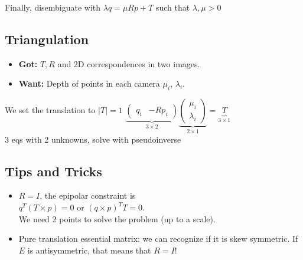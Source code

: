 Finally, disembiguate with $\lambda q = \mu R p + T$ such that $\lambda,
\mu > 0$

\subsection*{Triangulation}
\begin{itemize}
  \item \textbf{Got:} $T, R$ and 2D correspondences in two images.
  \item \textbf{Want:} Depth of points in each camera $\mu_i$, $\lambda_i$.
\end{itemize}

We set the translation to $|T| = 1$
$\underbrace{\begin{pmatrix}q_i & -R p_i\end{pmatrix}}_{3\times2}
\underbrace{\begin{pmatrix} \mu_i \\\lambda_i \end{pmatrix}}_{2\times1} =
\underbrace{T}_{3 \times 1}$\\
3 eqs with 2 unknowns, solve with pseudoinverse

\subsection*{Tips and Tricks}
\begin{itemize}
  \item $R = I$, the epipolar constraint is\\
    $q^T ( T \times p) = 0$ or $(q \times p)^T T = 0$.\\
    We need 2 points to solve the problem (up to a scale).
  \item Pure translation essential matrix: we can recognize if it is
    skew symmetric. If $E$ is antisymmetric, that means that $R = I$!
\end{itemize}
